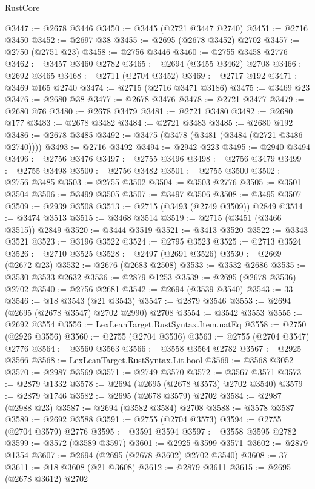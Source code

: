 \begin{lexlean}{RustCore}
\begin{coremodule}
@3447 := @2678 @3446
@3450 := @3445 (@2721 @3447 @2740)
@3451 := @2716 @3450
@3452 := @2697 @38
@3455 := @2695 (@2678 @3452) @2702
@3457 := @2750 (@2751 @23)
@3458 := @2756 @3446
@3460 := @2755 @3458 @2776
@3462 := @3457 @3460 @2782
@3465 := @2694 (@3455 @3462) @2708
@3466 := @2692 @3465
@3468 := @2711 (@2704 @3452)
@3469 := @2717 @192
@3471 := @3469 @165 @2740
@3474 := @2715 (@2716 @3471 @3186)
@3475 := @3469 @23
@3476 := @2680 @38
@3477 := @2678 @3476
@3478 := @2721 @3477
@3479 := @2680 @76
@3480 := @2678 @3479
@3481 := @2721 @3480
@3482 := @2680 @177
@3483 := @2678 @3482
@3484 := @2721 @3483
@3485 := @2680 @192
@3486 := @2678 @3485
@3492 := @3475 (@3478 (@3481 (@3484 (@2721 @3486 @2740))))
@3493 := @2716 @3492
@3494 := @2942 @223
@3495 := @2940 @3494
@3496 := @2756 @3476
@3497 := @2755 @3496
@3498 := @2756 @3479
@3499 := @2755 @3498
@3500 := @2756 @3482
@3501 := @2755 @3500
@3502 := @2756 @3485
@3503 := @2755 @3502
@3504 := @3503 @2776
@3505 := @3501 @3504
@3506 := @3499 @3505
@3507 := @3497 @3506
@3508 := @3495 @3507
@3509 := @2939 @3508
@3513 := @2715 (@3493 (@2749 @3509)) @2849
@3514 := @3474 @3513
@3515 := @3468 @3514
@3519 := @2715 (@3451 (@3466 @3515)) @2849
@3520 := @3444 @3519
@3521 := @3413 @3520
@3522 := @3343 @3521
@3523 := @3196 @3522
@3524 := @2795 @3523
@3525 := @2713 @3524
@3526 := @2710 @3525
@3528 := @2497 (@2691 @3526)
@3530 := @2669 (@2672 @23)
@3532 := @2676 (@2683 @2508)
@3533 := @3532 @2686
@3535 := @3530 @3533 @2632
@3536 := @2879 @1253
@3539 := @2695 (@2678 @3536) @2702
@3540 := @2756 @2681
@3542 := @2694 (@3539 @3540)
@3543 := 33
@3546 := @18 @3543 (@21 @3543)
@3547 := @2879 @3546
@3553 := @2694 (@2695 (@2678 @3547) @2702 @2990) @2708
@3554 := @3542 @3553
@3555 := @2692 @3554
@3556 := LexLeanTarget.RustSyntax.Item.natEq
@3558 := @2750 (@2926 @3556)
@3560 := @2755 (@2704 @3536)
@3563 := @2755 (@2704 @3547) @2776
@3564 := @3560 @3563
@3566 := @3558 @3564 @2782
@3567 := @2925 @3566
@3568 := LexLeanTarget.RustSyntax.Lit.bool
@3569 := @3568 @3052
@3570 := @2987 @3569
@3571 := @2749 @3570
@3572 := @3567 @3571
@3573 := @2879 @1332
@3578 := @2694 (@2695 (@2678 @3573) @2702 @3540)
@3579 := @2879 @1746
@3582 := @2695 (@2678 @3579) @2702
@3584 := @2987 (@2988 @23)
@3587 := @2694 (@3582 @3584) @2708
@3588 := @3578 @3587
@3589 := @2692 @3588
@3591 := @2755 (@2704 @3573)
@3594 := @2755 (@2704 @3579) @2776
@3595 := @3591 @3594
@3597 := @3558 @3595 @2782
@3599 := @3572 (@3589 @3597)
@3601 := @2925 @3599 @3571
@3602 := @2879 @1354
@3607 := @2694 (@2695 (@2678 @3602) @2702 @3540)
@3608 := 37
@3611 := @18 @3608 (@21 @3608)
@3612 := @2879 @3611
@3615 := @2695 (@2678 @3612) @2702

\end{coremodule}
\end{lexlean}
